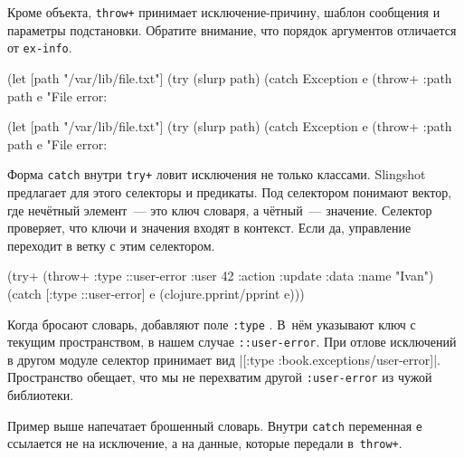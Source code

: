 \fi

Кроме объекта, \verb|throw+| принимает исключе\-ние-причину, шаблон сообщения и
параметры подстановки. Обратите внимание, что порядок аргументов отличается от
\verb|ex-info|.

\ifx\DEVICETYPE\MOBILE

\begin{english}
  \begin{clojure}
(let [path "/var/lib/file.txt"]
  (try
    (slurp path)
    (catch Exception e
      (throw+ {:path path} e
      "File error: %
  \end{clojure}
\end{english}

\else

\begin{english}
  \begin{clojure}
(let [path "/var/lib/file.txt"]
  (try
    (slurp path)
    (catch Exception e
      (throw+ {:path path} e "File error: %
  \end{clojure}
\end{english}

\fi


Форма \verb|catch| внутри \verb|try+| ловит исключения не только
классами. Slingshot предлагает для этого селекторы и предикаты. Под селектором
понимают вектор, где нечётный элемент~--- это ключ словаря, а чётный~---
значение. Селектор проверяет, что ключи и значения входят в контекст. Если да,
управление переходит в ветку с этим селектором.

\begin{english}
  \begin{clojure/lines}
(try+
 (throw+ {:type ::user-error
          :user 42
          :action :update
          :data {:name "Ivan"}})
 (catch [:type ::user-error] e
   (clojure.pprint/pprint e)))
  \end{clojure/lines}
\end{english}

Когда бросают словарь, добавляют поле \verb|:type| . В~нём указывают
ключ с текущим пространством, в нашем случае \verb|::user-error|. При отлове
исключений в другом модуле селектор принимает вид
\spverb|[:type :book.exceptions/user-error]|. Пространство обещает, что мы не
перехватим другой \texttt{:user\--error} из чужой библиотеки.

Пример выше напечатает брошенный словарь. Внутри \verb|catch| переменная
\verb|e| ссылается не на исключение, а на данные, которые передали
в~\verb|throw+|.

